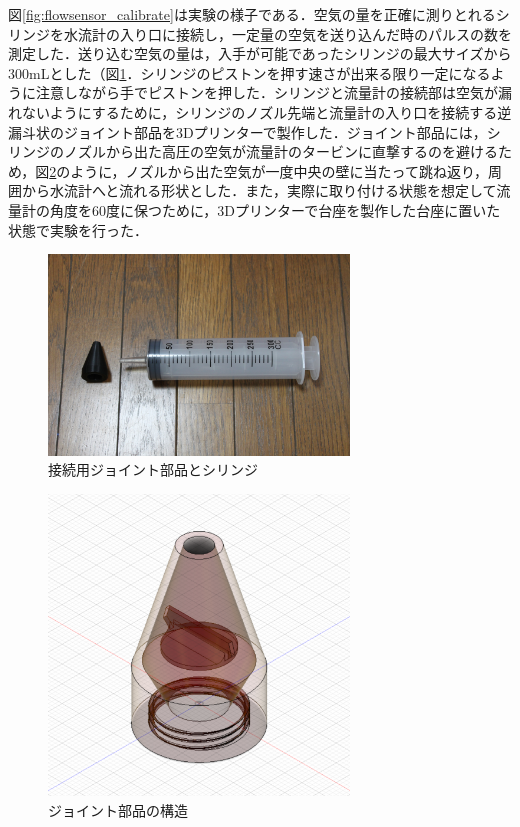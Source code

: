 図\ref{fig:flowsensor_calibrate}は実験の様子である．空気の量を正確に測りとれるシリンジを水流計の入り口に接続し，一定量の空気を送り込んだ時のパルスの数を測定した．送り込む空気の量は，入手が可能であったシリンジの最大サイズから300mLとした（図\ref{fig:syringe}．シリンジのピストンを押す速さが出来る限り一定になるように注意しながら手でピストンを押した．シリンジと流量計の接続部は空気が漏れないようにするために，シリンジのノズル先端と流量計の入り口を接続する逆漏斗状のジョイント部品を3Dプリンターで製作した．ジョイント部品には，シリンジのノズルから出た高圧の空気が流量計のタービンに直撃するのを避けるため，図\ref{fig:syringe_cone}のように，ノズルから出た空気が一度中央の壁に当たって跳ね返り，周囲から水流計へと流れる形状とした．また，実際に取り付ける状態を想定して流量計の角度を60度に保つために，3Dプリンターで台座を製作した台座に置いた状態で実験を行った．

\begin{figure}[H]
  \begin{center}
    \includegraphics[width=8cm]{fig/syringe}
    \caption{接続用ジョイント部品とシリンジ}
    \label{fig:syringe}
  \end{center}
\end{figure}

\begin{figure}[H]
  \begin{center}
    \includegraphics[width=8cm]{fig/syringe_cone}
    \caption{ジョイント部品の構造}
    \label{fig:syringe_cone}
  \end{center}
\end{figure}


